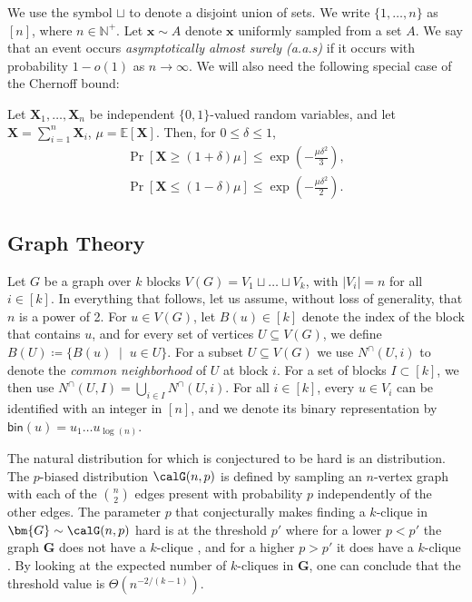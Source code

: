We use the symbol $\sqcup$ to denote a disjoint union of sets. We write $\{1, \dots, n\}$ as $[n]$, where $n \in \mathbb{N}^+$.
Let  
$\bm x \sim A$ denote $\bm x$ uniformly sampled from a set $A$. 
We say that an event occurs \emph{asymptotically almost surely (a.a.s)} if it occurs with probability $1-o(1)$ as $n\rightarrow \infty$. We will also need the following special case of the Chernoff bound:
\begin{theorem}
Let $\bm X_1,\dots,\bm X_n$ be independent $\{0,1\}$-valued random variables, and let
$\bm X = \sum_{i=1}^n \bm X_i$, $ 
\mu = \mathbb{E}[\bm X].
$
Then, for $0\leq \delta\leq 1$,
\begin{align*}
\Pr\left[\bm X \geq (1+\delta)\mu\right] \leq \exp\left(-\frac{\mu \delta^2}{3}\right),
\\
\Pr\left[\bm X \leq (1-\delta)\mu\right] \leq \exp\left(-\frac{\mu \delta^2}{2}\right).
\end{align*}
\end{theorem}

\subsection{Graph Theory}
Let $G$ be a graph over $k$ blocks $V(G)=V_1 \sqcup \dots \sqcup V_k$, with $\lvert V_i \rvert = n$ for all $i\in [k]$.  
In everything that follows, let us assume, without loss of generality, that $n$ is a power of 2. 
For $u\in V(G)$, let $B(u)\in [k]$ denote the index of the block that contains $u$, and for every set of vertices $U \subseteq V(G)$, we define $B(U) \coloneqq \{B(u)\;\mid \; u \in U\}$. For a subset $U\subseteq V(G)$ we use $N^\cap(U,i)$ to denote the \emph{common neighborhood} of $U$ at block $i$. For a set of blocks $I \subset [k]$, we then use $N^\cap(U,I) = \bigcup_{i \in I} N^\cap(U,i)$. For all $i \in [k]$, every $u \in V_i$ can be identified with an integer in $[n]$, and we denote its binary representation by $\mathsf{bin}(u) =u_1\ldots u_{\log(n)}$.

 The natural distribution for which \kClique is conjectured to be hard is an \erdosrenyi distribution. The $p$-biased \erdosrenyi distribution $\calG(n,p)$ is defined by sampling an $n$-vertex graph with each of the $\binom{n}{2}$ edges present with probability $p$ independently of the other edges. The parameter $p$ that conjecturally makes finding a $k$-clique in $\bm{G} \sim \calG(n,p)$ hard is at the threshold $p'$ where for a lower $p<p'$ the graph $\bm G$ does not have a $k$-clique \aas, and for a higher $p>p'$ it does have a $k$-clique \aas. By looking at the expected number of $k$-cliques in $\bm G$, one can conclude that the threshold value is $\Theta(n^{-2/(k-1)})$. 

